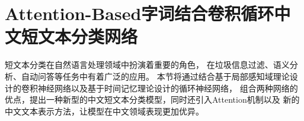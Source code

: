 \chapter{Attention-Based字词结合卷积循环中文短文本分类网络}
短文本分类在自然语言处理领域中扮演着重要的角色，
在垃圾信息过滤、语义分析、自动问答等任务中有着广泛的应用。
本节将通过结合基于局部感知域理论设计的卷积神经网络以及基于时间记忆理论设计的循环神经网络，
组合两种网络的优点，提出一种新型的中文短文本分类模型，同时还引入Attention机制以及
新的中文文本表示方法，让模型在中文领域表现更加优异。